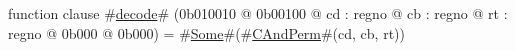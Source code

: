 function clause #\hyperref[zdecode]{decode}# (0b010010 @ 0b00100 @ cd : regno @ cb : regno @ rt : regno @ 0b000 @ 0b000) = #\hyperref[zSome]{Some}#(#\hyperref[zCAndPerm]{CAndPerm}#(cd, cb, rt))
